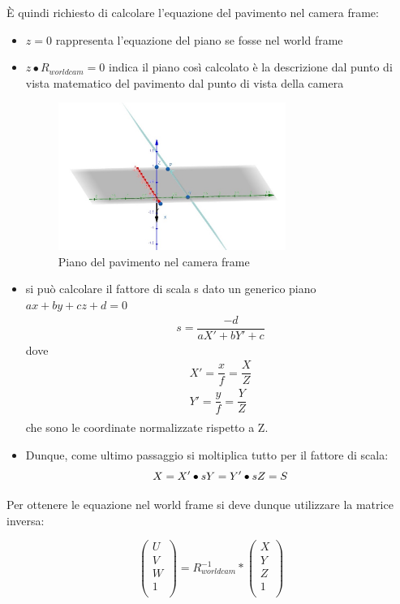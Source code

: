 È quindi richiesto di calcolare l'equazione del pavimento nel camera frame:
\begin{itemize}
	\item $z = 0$ rappresenta l'equazione del piano se fosse nel world frame
	\item $z \bullet R_{worldcam} = 0$ indica il piano così calcolato è la descrizione dal punto di vista matematico del pavimento dal punto di vista della camera
	\begin{figure}[H]
		\centering
		\includegraphics[width=0.7\textwidth]{Immagini/piano_camera.jpeg}
		\caption{Piano del pavimento nel camera frame}
		\label{fig:piano_camera}
	\end{figure}
	\item si può calcolare il fattore di scala s dato un generico piano $ax+by+cz+d=0$
		\begin{equation}
		\begin{split}
		s = \dfrac{-d}{aX'+bY'+c}	
		\end{split}
		\end{equation}
	dove
		\begin{equation}
		\begin{split}
		X'=\dfrac{x}{f}=\dfrac{X}{Z}\\
		Y'=\dfrac{y}{f}=\dfrac{Y}{Z} \\
		\end{split}
		\end{equation}
	che sono le coordinate normalizzate rispetto a Z.
	\item Dunque, come ultimo passaggio si moltiplica tutto per il fattore di scala:
		\begin{equation}
		X=X' \bullet s\\
		Y=Y' \bullet s\\
		Z=S
		\end{equation}
\end{itemize}

Per ottenere le equazione nel world frame si deve dunque utilizzare la matrice inversa:

$$
\begin{pmatrix}
U  \\
V  \\
W  \\
1  \\
\end{pmatrix}
=R_{worldcam}^{-1}*
\begin{pmatrix}
X  \\
Y  \\
Z  \\
1  \\
\end{pmatrix}
$$
